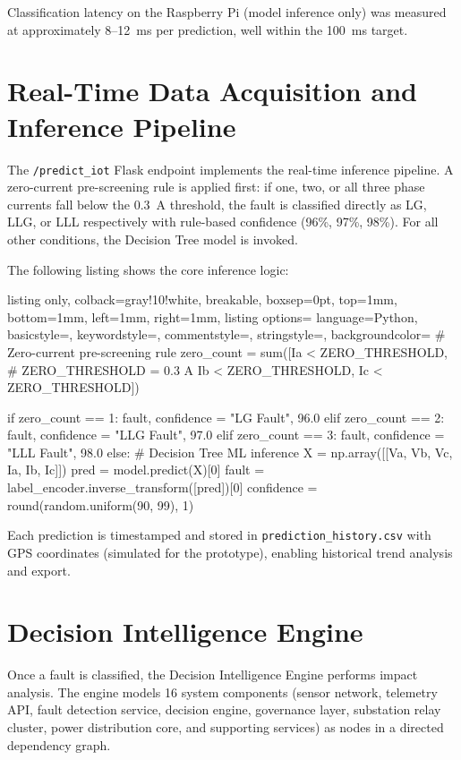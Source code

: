 Classification latency on the Raspberry Pi (model inference only) was measured at approximately 8--12~ms per prediction, well within the 100~ms target.

\section{Real-Time Data Acquisition and Inference Pipeline}

The \texttt{/predict\_iot} Flask endpoint implements the real-time inference pipeline. A zero-current pre-screening rule is applied first: if one, two, or all three phase currents fall below the 0.3~A threshold, the fault is classified directly as LG, LLG, or LLL respectively with rule-based confidence (96\%, 97\%, 98\%). For all other conditions, the Decision Tree model is invoked.

The following listing shows the core inference logic:

\begin{tcblisting}{listing only, colback=gray!10!white, breakable, boxsep=0pt, top=1mm, bottom=1mm, left=1mm, right=1mm,
listing options={
language=Python,
basicstyle=\small\ttfamily,
keywordstyle=\color{blue},
commentstyle=\color{gray},
stringstyle=\color{orange},
backgroundcolor=\color{gray!25}}}
# Zero-current pre-screening rule
zero_count = sum([Ia < ZERO_THRESHOLD,   # ZERO_THRESHOLD = 0.3 A
                  Ib < ZERO_THRESHOLD,
                  Ic < ZERO_THRESHOLD])

if zero_count == 1:
    fault, confidence = "LG Fault",  96.0
elif zero_count == 2:
    fault, confidence = "LLG Fault", 97.0
elif zero_count == 3:
    fault, confidence = "LLL Fault", 98.0
else:
    # Decision Tree ML inference
    X = np.array([[Va, Vb, Vc, Ia, Ib, Ic]])
    pred = model.predict(X)[0]
    fault = label_encoder.inverse_transform([pred])[0]
    confidence = round(random.uniform(90, 99), 1)
\end{tcblisting}

Each prediction is timestamped and stored in \texttt{prediction\_history.csv} with GPS coordinates (simulated for the prototype), enabling historical trend analysis and export.

\section{Decision Intelligence Engine}

Once a fault is classified, the Decision Intelligence Engine performs impact analysis. The engine models 16 system components (sensor network, telemetry API, fault detection service, decision engine, governance layer, substation relay cluster, power distribution core, and supporting services) as nodes in a directed dependency graph.

